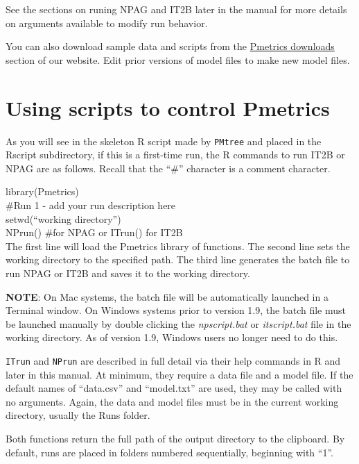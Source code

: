\documentclass[
]{book}
\begin{document}
See the sections on runing NPAG and IT2B later in the manual for more details on arguments available to modify run behavior.

You can also download sample data and scripts from the \href{http://lapk.org/pmetrics.php}{Pmetrics
downloads} section of our
website. Edit prior versions of model files to make new model files.

\hypertarget{using-scripts-to-control-pmetrics}{%
\section{Using scripts to control Pmetrics}\label{using-scripts-to-control-pmetrics}}

As you will see in the skeleton R script made by \texttt{PMtree} and placed in
the Rscript subdirectory, if this is a first-time run, the R commands to
run IT2B or NPAG are as follows. Recall that the ``\#'' character is a
comment character.

library(Pmetrics)\\
\#Run 1 - add your run description here\\
setwd(``working directory'')\\
NPrun() \#for NPAG or ITrun() for IT2B\\

The first line will load the Pmetrics library of functions. The second
line sets the working directory to the specified path. The third line
generates the batch file to run NPAG or IT2B and saves it to the working
directory.

\textbf{NOTE}: On Mac systems, the batch file will be automatically launched
in a Terminal window. On Windows systems prior to version 1.9, the batch
file must be launched manually by double clicking the \emph{npscript.bat} or
\emph{itscript.bat} file in the working directory. As of version 1.9, Windows
users no longer need to do this.

\texttt{ITrun} and \texttt{NPrun} are described in full detail via their help commands in R and later in this manual. At minimum, they require a data file and a model file. If the default names of ``data.csv'' and ``model.txt'' are used, they may be called with no arguments. Again, the data and model files must be in the current working directory, usually the Runs folder.

Both functions return the full path of the output directory to
the clipboard. By default, runs are placed in folders numbered
sequentially, beginning with ``1''.
\end{document}
